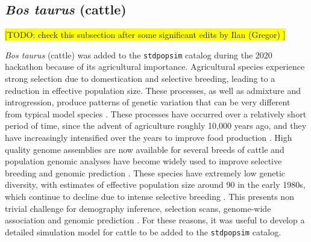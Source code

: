 \documentclass{article}
\newcommand{\stdpopsim}{\texttt{stdpopsim}\xspace}
\begin{document}
\hypertarget{bos-taurus}{%
	\subsection*{\texorpdfstring{\emph{Bos
				taurus} (cattle)}{Bos taurus (cattle)}}\label{bos-taurus}}

\colorbox{yellow}{[TODO: check this subsection after some significant edits by Ilan (Gregor) ]}


\emph{Bos taurus} (cattle) was added to the \texttt{\stdpopsim} catalog during the 2020 hackathon because of its agricultural importance. Agricultural species experience
strong selection due to domestication and selective breeding, leading
to a reduction in effective population size. These processes,
as well as admixture and introgression, produce patterns
of genetic variation that can be very different from typical model
species \citep{Larson2013}. These processes have occurred over a
relatively short period of time, since the advent of agriculture roughly 10,000 years ago, and they have increasingly intensified over the years to improve food production \citep{Gaut2018,MacLeod2013}. High quality genome assemblies are now
available for several breeds of cattle \citep[e.g.,][]{Rosen2020, Heaton2021,
Talenti2022} and population genomic analyses have become widely used to
improve selective breeding and genomic prediction \citep{Meuwissen2001,
MacLeod2014, Obsteter2021}. These species have extremely low genetic diversity,
with estimates of effective population size around 90 in the early 1980s, which continue to decline due to intense selective breeding \citep{MacLeod2013, VanRaden2020, Makanjouloa2020}. This presents non trivial challenge for demography inference, selection scans, genome-wide association and genomic prediction
\citep{MacLeod2013,MacLeod2014,Hartfield2022}. For these reasons, it was useful to develop a detailed simulation model for cattle to be added to the \texttt{\stdpopsim} catalog.
\end{document}

